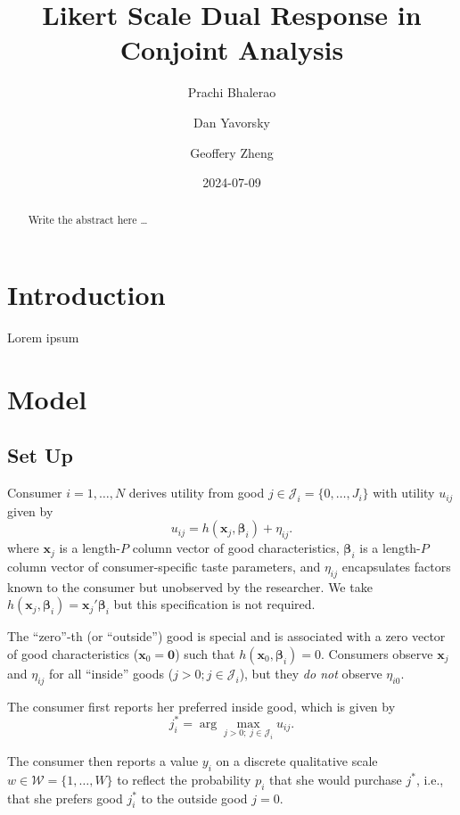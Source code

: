\documentclass[
  letterpaper,
  DIV=11,
  numbers=noendperiod]{scrartcl}
\title{Likert Scale Dual Response in Conjoint Analysis}
\author{Prachi Bhalerao \and Dan Yavorsky \and Geoffery Zheng}
\date{2024-07-09}
\begin{document}
\maketitle
\begin{abstract}
Write the abstract here \ldots{}
\end{abstract}


  \newcommand{\x}{\mathbf{x}}
  \newcommand{\bfbeta}{\boldsymbol{\beta}}
  \newcommand{\iid}{\stackrel{iid}{\sim}}

\section{Introduction}\label{sec-intro}

Lorem ipsum

\section{Model}\label{sec-model}

\subsection{Set Up}\label{set-up}

Consumer \(i=1,\ldots,N\) derives utility from good
\(j \in \mathcal{J}_i =  \lbrace 0,\ldots,J_i \rbrace\) with utility
\(u_{ij}\) given by \[
u_{ij} = h(\x_j, \bfbeta_i) + \eta_{ij}.
\] where \(\x_j\) is a length-\(P\) column vector of good
characteristics, \(\bfbeta_i\) is a length-\(P\) column vector of
consumer-specific taste parameters, and \(\eta_{ij}\) encapsulates
factors known to the consumer but unobserved by the researcher. We take
\(h(\x_j, \bfbeta_i) = \x_j'\bfbeta_i\) but this specification is not
required.

The ``zero''-th (or ``outside'') good is special and is associated with
a zero vector of good characteristics (\(\x_0 = \mathbf{0}\)) such that
\(h(\x_0, \bfbeta_i)=0\). Consumers observe \(\x_j\) and \(\eta_{ij}\)
for all ``inside'' goods (\(j>0; j \in \mathcal{J}_i\)), but they
\emph{do not} observe \(\eta_{i0}\).

The consumer first reports her preferred inside good, which is given by
\[
j^*_i = \arg\max_{j>0; \; j \in \mathcal{J}_i} u_{ij}.
\]

The consumer then reports a value \(y_i\) on a discrete qualitative
scale \(w \in \mathcal{W} = \lbrace 1, \ldots, W \rbrace\) to reflect
the probability \(p_i\) that she would purchase \(j^*\), i.e., that she
prefers good \(j^*_i\) to the outside good \(j=0\).
\end{document}
